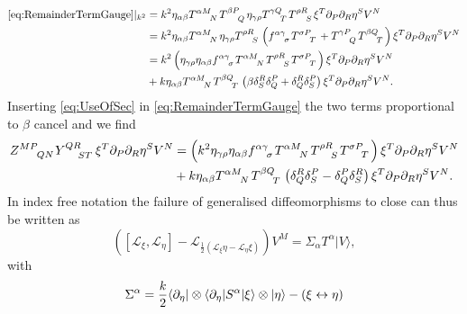 \begin{equation}\label{eq:UseOfSec}
    \begin{aligned}
    \eqref{eq:RemainderTermGauge}|_{k^2} &= k^2\eta_{\alpha\beta}\tensor{T}{^{\alpha M}_N}\tensor{T}{^{\beta P}_Q}\eta_{\gamma\rho}\tensor{T}{^{\gamma Q}_T}\tensor{T}{^{\rho R}_S}\xi^T\pd_P\pd_R\eta^SV^N\\ &= k^2\eta_{\alpha\beta}\tensor{T}{^{\alpha M}_N}\eta_{\gamma\rho}\tensor{T}{^{\rho R}_S}\left(\tensor{f}{^{\alpha\gamma}_\sigma}\tensor{T}{^{\sigma P}_T}+\tensor{T}{^{\gamma P}_Q}\tensor{T}{^{\beta Q}_T}\right)\xi^T\pd_P\pd_R\eta^SV^N\\
    &= k^2\left(\eta_{\gamma\rho}\eta_{\alpha\beta}\tensor{f}{^{\alpha\gamma}_\sigma}\tensor{T}{^{\alpha M}_N}\tensor{T}{^{\rho R}_S}\tensor{T}{^{\sigma P}_T}\right)\xi^T\pd_P\pd_R\eta^SV^N\\
    &+ k\eta_{\alpha\beta}\tensor{T}{^{\alpha M}_N}\tensor{T}{^{\beta Q}_T}\left(\beta\delta^R_S\delta^P_Q+\delta^R_Q\delta^P_S\right)\xi^T\pd_P\pd_R\eta^SV^N.
    \end{aligned}
\end{equation}
Inserting \eqref{eq:UseOfSec} in \eqref{eq:RemainderTermGauge} the two terms proportional to $\beta$ cancel and we find 
\begin{equation}
    \begin{aligned}
        \tensor{Z}{^{MP}_{QN}}\tensor{Y}{^{QR}_{ST}}\xi^T\pd_P\pd_R\eta^SV^N &= \left(k^2\eta_{\gamma\rho}\eta_{\alpha\beta}\tensor{f}{^{\alpha\gamma}_\sigma}\tensor{T}{^{\alpha M}_N}\tensor{T}{^{\rho R}_S}\tensor{T}{^{\sigma P}_T}\right)\xi^T\pd_P\pd_R\eta^SV^N\\
        &+k\eta_{\alpha\beta}\tensor{T}{^{\alpha M}_N}\tensor{T}{^{\beta Q}_T}\left(\delta^R_Q\delta^P_S-\delta_Q^P\delta_S^R\right) \xi^T\pd_P\pd_R\eta^SV^N.
    \end{aligned}
\end{equation}
In index free notation the failure of generalised diffeomorphisms to close can thus be written as
\begin{equation}\label{eq:AncillaryTransformation}
    \left(\left[\mathscr{L}_\xi,\mathscr{L}_\eta\right]-\mathscr{L}_{\frac{1}{2}\left(\mathscr{L}_\xi\eta-\mathscr{L}_\eta\xi\right)}\right)V^M = \Sigma_\alpha T^\alpha |V\rangle,
\end{equation}
with 
\begin{equation}
    \Sigma^\alpha = \frac{k}{2}\langle \partial_\eta|\otimes\langle \partial_\eta| S^\alpha|\xi\rangle \otimes |\eta\rangle - \left(\xi\leftrightarrow\eta\right)
\end{equation}
